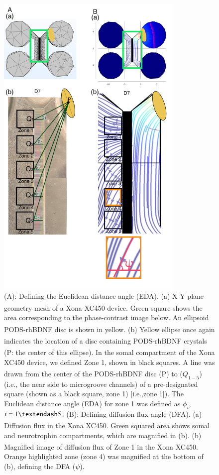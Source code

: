 \documentclass[review]{elsarticle}
\begin{document}
\begin{figure}
	\begin{center}
		\includegraphics[width=9cm]{Fig_8.jpg}
	\end{center}
	\caption{(A): Defining the Euclidean distance angle (EDA). (a) X-Y plane geometry mesh of a Xona\textsuperscript{\texttrademark} XC450 device. Green square shows the area corresponding to the phase-contrast image below. An ellipsoid PODS\textsuperscript{\textregistered}-rhBDNF disc is shown in yellow. (b) Yellow ellipse once again indicates the location of a disc containing PODS\textsuperscript{\textregistered}-rhBDNF crystals (P: the center of this ellipse). In the somal compartment of the Xona\textsuperscript{\texttrademark} XC450 device, we defined Zone 1, shown in black squares. A line was drawn from the center of the PODS\textsuperscript{\textregistered}-rhBDNF disc (P) to ($Q_{1-5}$) (i.e., the near side to microgroove channels) of a pre-designated square (shown as a black square, zone 1) [i.e.,zone 1]). The Euclidean distance angle (EDA) for zone 1 was defined as $\phi_{i}$, $i = 1\textendash 5$. (B): Defining diffusion flux angle (DFA). (a) Diffusion flux in the Xona\textsuperscript{\texttrademark} XC450. Green squared area shows somal and neurotrophin compartments, which are magnified in (b). (b) Magnified image of diffusion flux of Zone 1 in the Xona\textsuperscript{\texttrademark} XC450. Orange highlighted zone (zone 4) was magnified at the bottom of (b), defining the DFA ($\psi$).}
\end{figure}
\end{document}
